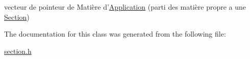 vecteur de pointeur de Matière d'\hyperlink{class_application}{Application} (parti des matière propre a une \hyperlink{class_section}{Section}) 



The documentation for this class was generated from the following file\+:\begin{DoxyCompactItemize}
\item 
\hyperlink{section_8h}{section.\+h}\end{DoxyCompactItemize}
